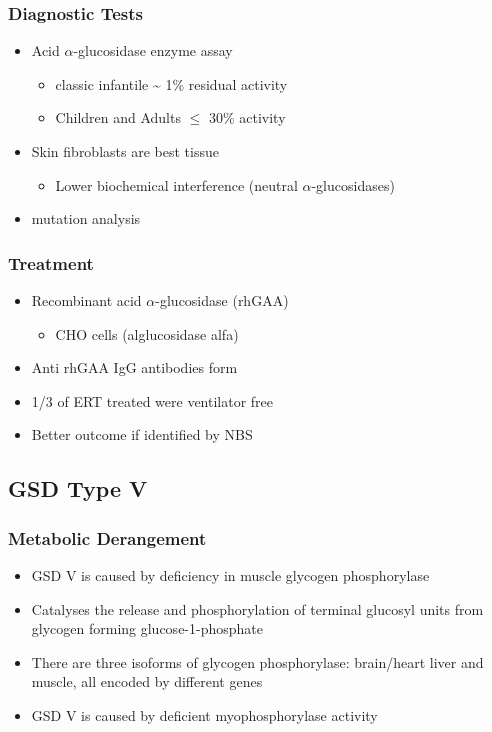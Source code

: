 \documentclass{scrartcl}
\begin{document}
\subsubsection{Diagnostic Tests}
\label{sec:orgaa4e220}
\begin{itemize}
\item Acid \(\alpha\)-glucosidase enzyme assay
\begin{itemize}
\item classic infantile \textasciitilde{} 1\% residual activity
\item Children and Adults \(\le\) 30\% activity
\end{itemize}
\item Skin fibroblasts are best tissue
\begin{itemize}
\item Lower biochemical interference (neutral \(\alpha\)-glucosidases)
\end{itemize}
\item mutation analysis
\end{itemize}
\subsubsection{Treatment}
\label{sec:orgc462ab9}
\begin{itemize}
\item Recombinant acid \(\alpha\)-glucosidase (rhGAA)
\begin{itemize}
\item CHO cells (alglucosidase alfa)
\end{itemize}
\item Anti rhGAA IgG antibodies form
\item 1/3 of ERT treated were ventilator free
\item Better outcome if identified by NBS
\end{itemize}

\subsection{GSD Type V}
\label{sec:orgb667b72}
\subsubsection{Metabolic Derangement}
\label{sec:org0b6e70f}
\begin{itemize}
\item GSD V is caused by deficiency in muscle glycogen phosphorylase
\item Catalyses the release and phosphorylation of terminal glucosyl units
from glycogen forming glucose-1-phosphate
\item There are three isoforms of glycogen phosphorylase: brain/heart
liver and muscle, all encoded by different genes
\item GSD V is caused by deficient myophosphorylase activity
\end{itemize}
\end{document}
